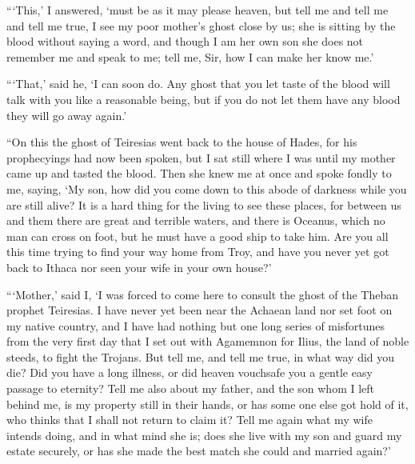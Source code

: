 “‘This,’ I answered, ‘must be as it may please heaven, but tell me and tell me
and tell me true, I see my poor mother’s ghost close by us; she is sitting by
the blood without saying a word, and though I am her own son she does not
remember me and speak to me; tell me, Sir, how I can make her know me.’

“‘That,’ said he, ‘I can soon do. Any ghost that you let taste of the blood
will talk with you like a reasonable being, but if you do not let them have any
blood they will go away again.’

“On this the ghost of Teiresias went back to the house of Hades, for his
prophecyings had now been spoken, but I sat still where I was until my mother
came up and tasted the blood. Then she knew me at once and spoke fondly to me,
saying, ‘My son, how did you come down to this abode of darkness while you are
still alive? It is a hard thing for the living to see these places, for between
us and them there are great and terrible waters, and there is Oceanus, which no
man can cross on foot, but he must have a good ship to take him. Are you all
this time trying to find your way home from Troy, and have you never yet got
back to Ithaca nor seen your wife in your own house?’

“‘Mother,’ said I, ‘I was forced to come here to consult the ghost of the
Theban prophet Teiresias. I have never yet been near the Achaean land nor set
foot on my native country, and I have had nothing but one long series of
misfortunes from the very first day that I set out with Agamemnon for Ilius,
the land of noble steeds, to fight the Trojans. But tell me, and tell me true,
in what way did you die? Did you have a long illness, or did heaven vouchsafe
you a gentle easy passage to eternity? Tell me also about my father, and the
son whom I left behind me, is my property still in their hands, or has some one
else got hold of it, who thinks that I shall not return to claim it? Tell me
again what my wife intends doing, and in what mind she is; does she live with
my son and guard my estate securely, or has she made the best match she could
and married again?’

